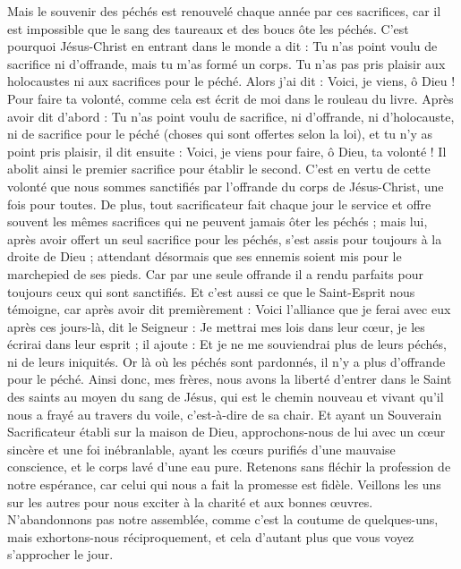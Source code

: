\begin{multicols}{2}
Mais le souvenir des péchés est renouvelé chaque année par ces sacrifices,
car il est impossible que le sang des taureaux et des boucs ôte les péchés.
C'est pourquoi Jésus-Christ en entrant dans le monde a dit : Tu n'as point voulu de sacrifice ni d'offrande, mais tu m'as formé un corps.
Tu n'as pas pris plaisir aux holocaustes ni aux sacrifices pour le péché.
Alors j'ai dit : Voici, je viens, ô Dieu ! Pour faire ta volonté, comme cela est écrit de moi dans le rouleau du livre.
Après avoir dit d’abord : Tu n'as point voulu de sacrifice, ni d'offrande, ni d'holocauste, ni de sacrifice pour le péché (choses qui sont offertes selon la loi), et tu n'y as point pris plaisir, il dit ensuite : Voici, je viens pour faire, ô Dieu, ta volonté !
Il abolit ainsi le premier sacrifice pour établir le second.
C’est en vertu de cette volonté que nous sommes sanctifiés par l’offrande du corps de Jésus-Christ, une fois pour toutes.
De plus, tout sacrificateur fait chaque jour le service et offre souvent les mêmes sacrifices qui ne peuvent jamais ôter les péchés ;
mais lui, après avoir offert un seul sacrifice pour les péchés, s’est assis pour toujours à la droite de Dieu ;
attendant désormais que ses ennemis  soient mis pour le marchepied de ses pieds.
Car par une seule offrande il a rendu parfaits pour toujours ceux qui sont sanctifiés.
Et c'est aussi ce que le Saint-Esprit nous témoigne, car après avoir dit premièrement :
Voici l'alliance que je ferai avec eux après ces jours-là, dit le Seigneur : Je mettrai mes lois dans leur cœur, je les écrirai dans leur esprit ; il ajoute :
Et je ne me souviendrai plus de leurs péchés, ni de leurs iniquités.
Or là où les péchés sont pardonnés, il n'y a plus d’offrande pour le péché.
Ainsi donc, mes frères, nous avons la liberté d'entrer dans le Saint des saints au moyen du sang de Jésus,
qui est le chemin nouveau et vivant qu'il nous a frayé au travers du voile, c’est-à-dire de sa chair.
Et ayant un Souverain Sacrificateur établi sur la maison de Dieu,
approchons-nous de lui avec un cœur sincère et une foi inébranlable, ayant les cœurs purifiés d’une mauvaise conscience, et le corps lavé d’une eau pure.
Retenons sans fléchir la profession de notre espérance, car celui qui nous a fait la promesse est fidèle.
Veillons les uns sur les autres pour nous exciter à la charité et aux bonnes œuvres.
N’abandonnons pas notre assemblée, comme c’est la coutume de quelques-uns, mais exhortons-nous réciproquement, et cela d'autant plus que vous voyez s’approcher le jour.

\end{multicols}
